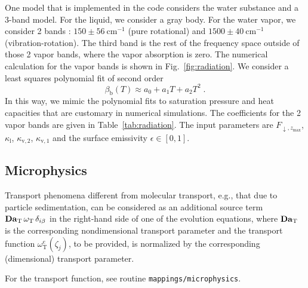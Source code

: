 One model that is implemented in the code considers the water substance and a 3-band model. For the liquid, we consider a gray body. For the water vapor, we consider 2 bands \citep{jeevanjee2023climate}: $150\pm 56~\mathrm{cm}^{-1}$ (pure rotational) and $1500\pm 40~\mathrm{cm}^{-1}$ (vibration-rotation). The third band is the rest of the frequency space outside of those 2 vapor bands, where the vapor absorption is zero. The numerical calculation for the vapor bands is shown in Fig.~\ref{fig:radiation}. We consider a least squares polynomial fit of second order 
\begin{equation}
    \beta_\mathrm{b}(T)\approx a_0+a_1T+a_2T^2 \;.
\end{equation}
In this way, we mimic the polynomial fits to saturation pressure and heat capacities that are customary in numerical simulations. The coefficients for the 2 vapor bands are given in Table~\ref{tab:radiation}. The input parameters are $F_{\downarrow,z_\mathrm{max}}$, $\kappa_\mathrm{l}$, $\kappa_\mathrm{v,2}$, $\kappa_\mathrm{v,1}$ and the surface emissivity $\epsilon\in[0,1]$. 

\subsection{Microphysics}

Transport phenomena different from molecular transport, e.g., that due to particle sedimentation, can be considered as an additional source term $\mathrm{\bf Da}_\mathrm{T}\,\omega_\mathrm{T}\,\delta_{i\beta}$ in the right-hand side of one of the evolution equations, where $\mathrm{\bf Da}_\mathrm{T}$ is the corresponding nondimensional transport parameter and the transport function $\omega_\mathrm{T}^e(\zeta_j)$, to be provided, is normalized by the corresponding (dimensional) transport parameter.

For the transport function, see routine {\tt mappings/microphysics}.


